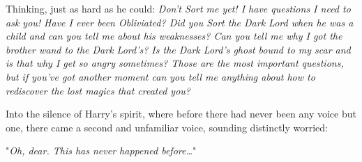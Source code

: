Thinking, just as hard as he could: \emph{Don't Sort me yet! I have questions I 
need to ask you! Have I ever been Obliviated? Did you Sort the Dark Lord when 
he was a child and can you tell me about his weaknesses? Can you tell me why I 
got the brother wand to the Dark Lord's? Is the Dark Lord's ghost bound to my 
scar and is that why I get so angry sometimes? Those are the most important 
questions, but if you've got another moment can you tell me anything about how 
to rediscover the lost magics that created you?}

Into the silence of Harry's spirit, where before there had never been any voice 
but one, there came a second and unfamiliar voice, sounding distinctly worried:

"\emph{Oh, dear. This has never happened before{\ldots}}"
